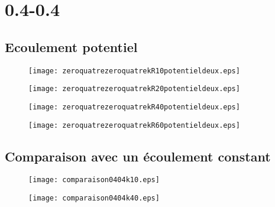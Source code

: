 \section{0.4-0.4}
\subsection{Ecoulement potentiel}
\begin{figure}[ht]
\begin{center}
     \texttt{[image: zeroquatrezeroquatrekR10potentieldeux.eps]}
\end{center}
\caption{}
\end{figure}

\begin{figure}[ht]
\begin{center}
     \texttt{[image: zeroquatrezeroquatrekR20potentieldeux.eps]}
\end{center}
\caption{}
\end{figure}

\begin{figure}[ht]
\begin{center}
     \texttt{[image: zeroquatrezeroquatrekR40potentieldeux.eps]}
\end{center}
\caption{}

\end{figure}

\begin{figure}[ht]
\begin{center}
     \texttt{[image: zeroquatrezeroquatrekR60potentieldeux.eps]}
\end{center}
\caption{}

\end{figure}

\subsection{Comparaison avec un \'ecoulement constant}

 \begin{figure}[ht]
\begin{center}
     \texttt{[image: comparaison0404k10.eps]}
\end{center}
\caption{}

\end{figure}

 \begin{figure}[ht]
\begin{center}
     \texttt{[image: comparaison0404k40.eps]}
\end{center}
\caption{}

\end{figure}


